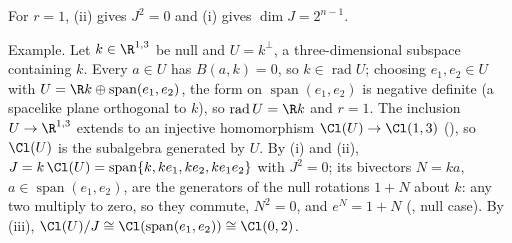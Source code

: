 For $r = 1$, (ii) gives $J^{2} = 0$ and (i) gives $\dim J = 2^{n-1}$.

Example. Let $k \in \R^{1,3}$ be null and $U = k^{\perp}$, a three-dimensional subspace containing $k$. Every $a \in U$ has $B(a, k) = 0$, so $k \in \operatorname{rad} U$; choosing $e_1, e_2 \in U$ with $U = \R k \oplus \operatorname{span}(e_1, e_2)$, the form on $\operatorname{span}(e_1, e_2)$ is negative definite (a spacelike plane orthogonal to $k$), so $\operatorname{rad} U = \R k$ and $r = 1$. The inclusion $U \to \R^{1,3}$ extends to an injective homomorphism $\Cl(U) \to \Cl(1,3)$ (), so $\Cl(U)$ is the subalgebra generated by $U$. By (i) and (ii), $J = k\,\Cl(U) = \operatorname{span}\{k, k e_1, k e_2, k e_1 e_2\}$ with $J^{2} = 0$; its bivectors $N = k a$, $a \in \operatorname{span}(e_1, e_2)$, are the generators of the null rotations $1 + N$ about $k$: any two multiply to zero, so they commute, $N^{2} = 0$, and $e^{N} = 1 + N$ (, null case). By (iii), $\Cl(U)/J \cong \Cl(\operatorname{span}(e_1, e_2)) \cong \Cl(0,2)$.
